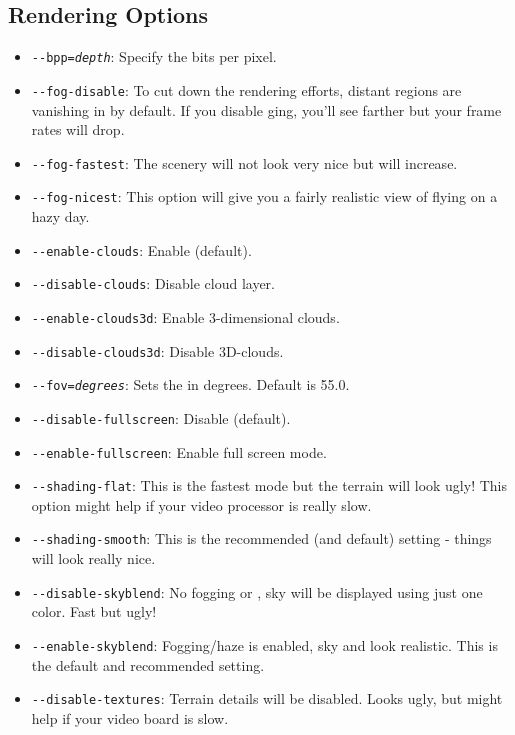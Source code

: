 \subsection{Rendering Options}
\begin{itemize}
\item{\texttt{-$ $-bpp={\it depth}}}: Specify the bits per pixel.
\item{\texttt{-$ $-fog-disable}}: To cut down the rendering efforts, distant
  regions are vanishing in  by default. If you disable ging,
  you'll see farther but your frame rates will drop.
\item{\texttt{-$ $-fog-fastest}}: The scenery will not look very nice but
   will increase.
\item{\texttt{-$ $-fog-nicest}}: This option will give you a fairly realistic
  view of flying on a hazy day.
\item{\texttt{-$ $-enable-clouds}}: Enable  (default).
\item{\texttt{-$ $-disable-clouds}}: Disable cloud layer.
\item{\texttt{-$ $-enable-clouds3d}}: Enable 3-dimensional clouds.
\item{\texttt{-$ $-disable-clouds3d}}: Disable 3D-clouds.
\item{\texttt{-$ $-fov={\it degrees}}}: Sets the  in degrees.
Default is 55.0.
\item{\texttt{-$ $-disable-fullscreen}}: Disable  (default).
\item{\texttt{-$ $-enable-fullscreen}}: Enable full screen mode.
\item{\texttt{-$ $-shading-flat}}: This is the fastest mode but the terrain will look ugly!
This option might help if your video processor is really slow.
\item{\texttt{-$ $-shading-smooth}}: This is the recommended (and default) setting - things will look really nice.
\item{\texttt{-$ $-disable-skyblend}}: No fogging or , sky will be displayed
  using just one color. Fast but ugly!
\item{\texttt{-$ $-enable-skyblend}}: Fogging/haze is enabled, sky and  look realistic. This is the default and recommended setting.
\item{\texttt{-$ $-disable-textures}}: Terrain details will be disabled. Looks ugly, but might help if your video board is slow.

\end{itemize}
